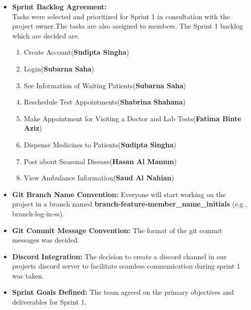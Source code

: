 \documentclass[a4paper,12pt]{article}
\begin{document}
\begin{itemize}
\begin{itemize}
\begin{itemize}
                \end{itemize}
        \end{itemize}

    \item \textbf{Sprint Backlog Agreement:}\\Tasks were selected and prioritized for Sprint 1 in consultation
        with the project owner.The tasks are also assigned to members. The Sprint 1 backlog which are decided are.
        \begin{enumerate}
            \item Create Account(\textbf{Sudipta Singha})
            \item Login(\textbf{Subarna Saha})
            \item See Information of Waiting Patients(\textbf{Subarna Saha})
            \item Reschedule Test Appointments(\textbf{Shabrina Shahana})
            \item Make Appointment for Visiting a Doctor and Lab Tests(\textbf{Fatima Binte Aziz})
            \item Dispense Medicines to Patients(\textbf{Sudipta Singha})
            \item Post about Seasonal Disease(\textbf{Hasan Al Mamun})
            \item View Ambulance Information(\textbf{Saud Al Nahian})

        \end{enumerate}
    \item \textbf{Git Branch Name Convention: }Everyone will start working on the project in a branch named
        \textbf{branch-feature-member\_name\_initials} (e.g., branch-log-in-ss).
    \item \textbf{Git Commit Message Convention: }The format of the git commit messages was decided.
    \item \textbf{Discord Integration: } The decision to create a discord channel in our projects discord server to
        facilitate seamless communication during sprint 1 was taken.
    \item \textbf{Sprint Goals Defined: }The team agreed on the primary objectives and deliverables for Sprint
        1.
\end{itemize}
\newpage
\end{document}
